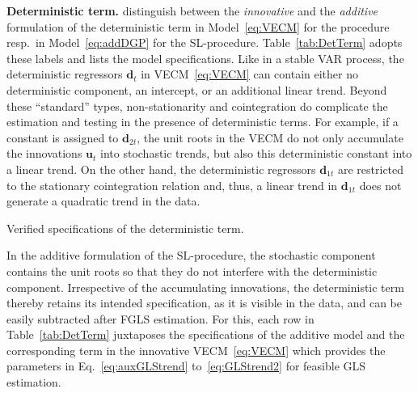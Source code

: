 \textbf{Deterministic term.} \citet{JohansenNielsen2018} distinguish between the \textit{innovative} and the \textit{additive} formulation of the deterministic term in Model~\eqref{eq:VECM} for the \citeauthor{Johansen1996} procedure resp.~in Model~\eqref{eq:addDGP} for the SL-procedure. Table~\ref{tab:DetTerm} adopts these labels and lists the model specifications. Like in a stable VAR process, the deterministic regressors $\boldsymbol{d}_t $ in VECM~\eqref{eq:VECM} can contain either no deterministic component, an intercept, or an additional linear trend. Beyond these ``standard'' types, non-stationarity and cointegration do complicate the estimation and testing in the presence of deterministic terms. For example, if a constant is assigned to $ \boldsymbol{d}_{2t} $, the unit roots in the VECM do not only accumulate the innovations $ \boldsymbol{u}_t $ into stochastic trends, but also this deterministic constant into a linear trend. On the other hand, the deterministic regressors $ \boldsymbol{d}_{1t} $ are restricted to the stationary cointegration relation and, thus, a linear trend in $ \boldsymbol{d}_{1t} $ does not generate a quadratic trend in the data. 
\begin{table}[ht]	%
	\centering
	\caption{Verified specifications of the deterministic term.}
	\resizebox{\textwidth}{!}{
		}
	\label{tab:DetTerm}		
\end{table}
In the additive formulation of the SL-procedure, the stochastic component contains the unit roots so that they do not interfere with the deterministic component. Irrespective of the accumulating innovations, the deterministic term thereby retains its intended specification, as it is visible in the data, and can be easily subtracted after FGLS estimation. For this, each row in Table~\ref{tab:DetTerm} juxtaposes the specifications of the additive model and the corresponding term in the innovative VECM~\eqref{eq:VECM} which provides the parameters in Eq.~\eqref{eq:auxGLStrend} to~\eqref{eq:GLStrend2} for feasible GLS estimation.

